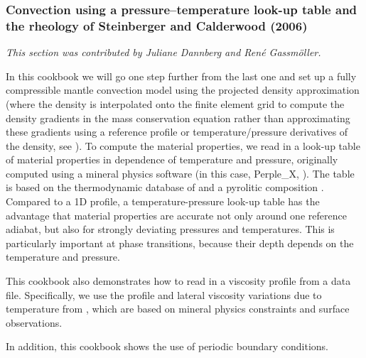 \subsubsection{Convection using a pressure--temperature look-up table and the rheology of Steinberger and Calderwood (2006)}
\label{sec:cookbooks-steinberger}

\textit{This section was contributed by Juliane Dannberg and Ren{\'e} Gassm{\"o}ller.}

In this cookbook we will go one step further from the last one and set up a fully compressible mantle convection model using the projected density approximation (where the density is interpolated onto the finite element grid to compute the density gradients in the mass conservation equation rather than approximating these gradients using a reference profile or temperature/pressure derivatives of the density, see \cite{gassmoller2020formulations}). To compute the material properties, we read in a look-up table of material properties in dependence of temperature and pressure, originally computed using a mineral physics software (in this case, Perple\_X, \cite{connolly2005computation}). The table is based on the thermodynamic database of \cite{stixrude2011thermodynamics} and a pyrolitic composition \cite{ringwood1988nature}. Compared to a 1D profile, a temperature-pressure look-up table has the advantage that material properties are accurate not only around one reference adiabat, but also for strongly deviating pressures and temperatures. This is particularly important at phase transitions, because their depth depends on the temperature and pressure.

This cookbook also demonstrates how to read in a viscosity profile from a data file. Specifically, we use the profile and lateral viscosity variations due to temperature from \cite{stca06}, which are based on mineral physics constraints and surface observations. 

In addition, this cookbook shows the use of periodic boundary conditions. 

